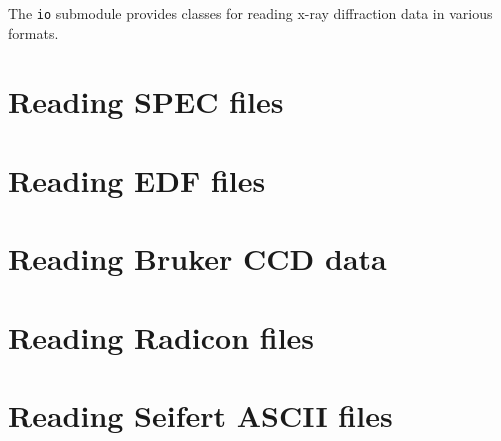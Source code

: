 
The {\tt io} submodule provides classes for reading x-ray diffraction data in
various formats. 

\section{Reading SPEC files}

\section{Reading EDF files}

\section{Reading Bruker CCD data}

\section{Reading Radicon files}

\section{Reading Seifert ASCII files}

